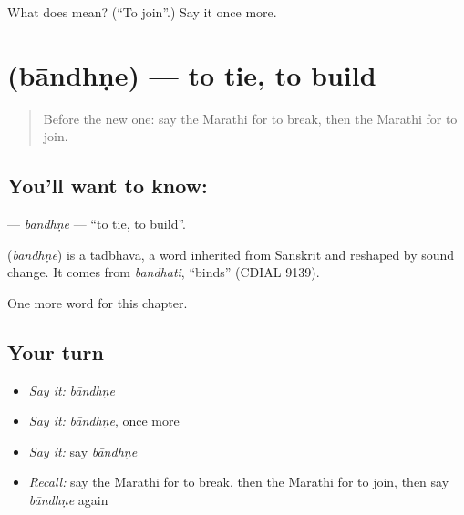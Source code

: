 \begin{tcolorbox}[breakable,colback=teal!4,colframe=teal!35!black,title={Before you move on}]
What does  mean? (\textquotedblleft{}To join\textquotedblright{}.) Say it once more.
\end{tcolorbox}
\section[\texorpdfstring{\mr{बांधणे} (bāndhṇe)}{बांधणे (bāndhṇe)}]{ (bāndhṇe) — to tie, to build}

\label{lesson:MR-C155-bandhne}



\begin{quote}
Before the new one: say the Marathi for to break, then the Marathi for to join.
\end{quote}

\subsection*{You'll want to know: }
\textbf{} — \emph{bāndhṇe} — \textquotedblleft{}to tie, to build\textquotedblright{}.

\begin{cousinweb}
\textbf{} (\emph{bāndhṇe}) is a tadbhava, a word inherited from Sanskrit and reshaped by sound change. It comes from \emph{bandhati}, \textquotedblleft{}binds\textquotedblright{} (CDIAL 9139).
\end{cousinweb}

\begin{grammarlens}[title={What you've built}]
One more word for this chapter.
\end{grammarlens}

\subsection*{Your turn}
\begin{itemize}
\raggedright
  \item \emph{Say it:} \emph{bāndhṇe}
  \item \emph{Say it:} \emph{bāndhṇe}, once more
  \item \emph{Say it:} say \emph{bāndhṇe}
  \item \emph{Recall:} say the Marathi for to break, then the Marathi for to join, then say \emph{bāndhṇe} again
\end{itemize}

